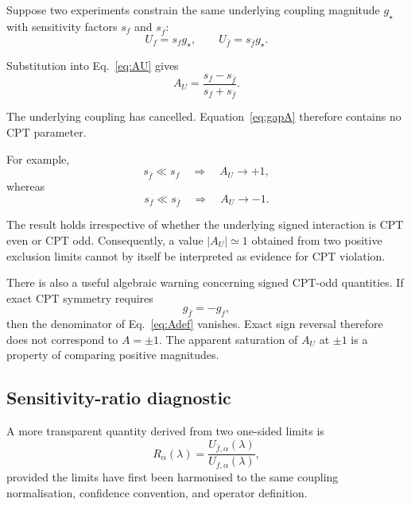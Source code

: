 \documentclass[aps,prd,reprint,superscriptaddress,nofootinbib]{revtex4-2}
\begin{document}
	Suppose two experiments constrain the same underlying coupling magnitude
	$g_\star$ with sensitivity factors $s_f$ and $s_{\bar f}$:
	\begin{equation}
		U_f=s_f g_\star,
		\qquad
		U_{\bar f}=s_{\bar f}g_\star .
		\label{eq:sensitivity}
	\end{equation}
	
	Substitution into Eq.~\eqref{eq:AU} gives
	\begin{equation}
		A_U
		=
		\frac{s_f-s_{\bar f}}
		{s_f+s_{\bar f}}.
		\label{eq:gapA}
	\end{equation}
	
	The underlying coupling has cancelled. Equation~\eqref{eq:gapA}
	therefore contains no CPT parameter.
	
	For example,
	\begin{equation}
		s_{\bar f}\ll s_f
		\quad\Longrightarrow\quad
		A_U\rightarrow +1,
	\end{equation}
	whereas
	\begin{equation}
		s_f\ll s_{\bar f}
		\quad\Longrightarrow\quad
		A_U\rightarrow -1.
	\end{equation}
	
	The result holds irrespective of whether the underlying signed
	interaction is CPT even or CPT odd. Consequently, a value
	$|A_U|\simeq1$ obtained from two positive exclusion limits cannot by
	itself be interpreted as evidence for CPT violation.
	
	There is also a useful algebraic warning concerning signed
	CPT-odd quantities. If exact CPT symmetry requires
	\begin{equation}
		g_{\bar f}=-g_f,
	\end{equation}
	then the denominator of Eq.~\eqref{eq:Adef} vanishes. Exact
	sign reversal therefore does not correspond to $A=\pm1$. The apparent
	saturation of $A_U$ at $\pm1$ is a property of comparing positive
	magnitudes.
	
	\subsection{Sensitivity-ratio diagnostic}
	
	A more transparent quantity derived from two one-sided limits is
	\begin{equation}
		R_\alpha(\lambda)
		=
		\frac{U_{\bar f,\alpha}(\lambda)}
		{U_{f,\alpha}(\lambda)},
		\label{eq:R}
	\end{equation}
	provided the limits have first been harmonised to the same coupling
	normalisation, confidence convention, and operator definition.
	
\end{document}
